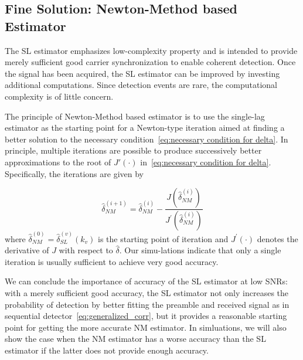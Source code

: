 \subsection{Fine Solution: Newton-Method based Estimator}

The SL estimator emphasizes low-complexity property and is intended
to provide merely sufficient good carrier synchronization to enable coherent detection.
Once the signal has been acquired, the SL estimator can be improved by 
investing additional computations. Since detection events are rare, the computational
complexity is of little concern.

The principle of Newton-Method based estimator is to use the single-lag estimator as the starting point for a Newton-type iteration 
aimed at finding a better solution to the necessary condition~\eqref{eq:necessary condition for delta}. 
In principle, multiple iterations are possible to produce successively better approximations to the root of
$J'(\cdot)$ in~\eqref{eq:necessary condition for delta}. Specifically, the iterations are given by

\begin{equation}
  \label{eq:iter_NM_est}
  \hat{\delta}_{NM}^{(i+1)}=\hat{\delta}_{NM}^{(i)}-
  \frac{J(\hat{\delta}_{NM}^{(i)})}{J^\prime(\hat{\delta}_{NM}^{(i)})}
\end{equation}
where $\hat{\delta}_{NM}^{(0)}=\hat{\delta}^{(v)}_{SL}(k_v)$ is the starting point of iteration and
$J^\prime(\cdot)$ denotes the derivative of $J$ with respect to $\hat{\delta}$. 
Our simu-lations indicate that only a single iteration is usually sufficient to achieve very good accuracy.

We can conclude the importance of accuracy of the SL estimator at low SNRs: 
with a merely sufficient good accuracy, the SL estimator not only increases the probability of detection by better
fitting the preamble and received signal as in sequential detector~\eqref{eq:generalized_corr}, but 
it provides a reasonable starting point for
getting the more accurate NM estimator. 
In simluations,
we will also show the case when the NM estimator has a worse accuracy than the SL estimator if the latter does not provide enough accuracy. 

